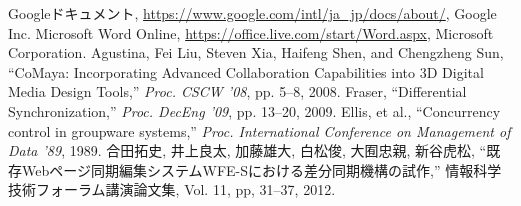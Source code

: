 \renewcommand{\bibname}{参考文献}
\begin{thebibliography}{Longest9}

Googleドキュメント, \url{https://www.google.com/intl/ja_jp/docs/about/}, Google Inc.
Microsoft Word Online, \url{https://office.live.com/start/Word.aspx}, Microsoft Corporation.
Agustina, Fei Liu, Steven Xia, Haifeng Shen, and Chengzheng Sun, ``CoMaya: Incorporating Advanced Collaboration Capabilities into 3D Digital Media Design Tools,'' {\it Proc. CSCW '08}, pp. 5--8, 2008.
Fraser,	``Differential Synchronization,''  {\it Proc. DecEng '09}, pp. 13--20, 2009.
Ellis, et al., ``Concurrency control in groupware systems,'' {\it Proc. International Conference on Management of Data '89}, 1989.
合田拓史, 井上良太, 加藤雄大, 白松俊, 大囿忠親, 新谷虎松, ``既存Webページ同期編集システムWFE-Sにおける差分同期機構の試作,'' 情報科学技術フォーラム講演論文集, Vol. 11, pp, 31--37, 2012.

\end{thebibliography}
